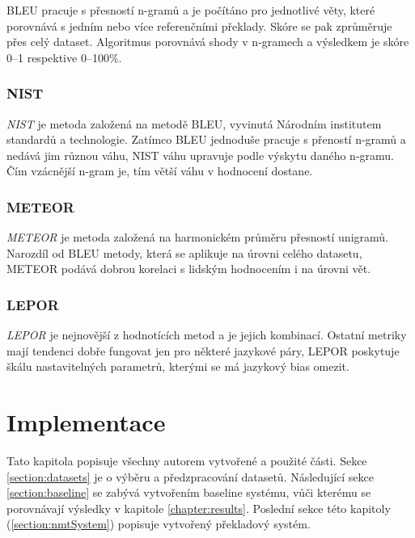 BLEU pracuje s přesností n-gramů a je počítáno pro jednotlivé věty, které porovnává s jedním nebo více referenčními překlady. Skóre se pak zprůměruje přes celý dataset. Algoritmus porovnává shody v n-gramech a výsledkem je skóre 0--1 respektive 0--100\%.

\subsection{NIST}
\emph{NIST} \cite{NIST} je metoda založená na metodě BLEU, vyvinutá Národním institutem standardů a technologie. Zatímco BLEU jednoduše pracuje s přeností n-gramů a nedává jim různou váhu, NIST váhu upravuje podle výskytu daného n-gramu. Čím vzácnější n-gram je, tím větší váhu v hodnocení dostane.


\subsection{METEOR}
\emph{METEOR} \cite{METEOR} je metoda založená na harmonickém průměru přesností unigramů. Narozdíl od BLEU metody, která se aplikuje na úrovni celého datasetu, METEOR podává dobrou korelaci s lidským hodnocením i na úrovni vět. 

\subsection{LEPOR}
\emph{LEPOR} \cite{LEPOR} je nejnovější z hodnotících metod a je jejich kombinací. Ostatní metriky mají tendenci dobře fungovat jen pro některé jazykové páry, LEPOR poskytuje škálu nastavitelných parametrů, kterými se má jazykový bias omezit.


\chapter{Implementace} \label{chapter:implementation}
Tato kapitola popisuje všechny autorem vytvořené a použité části. Sekce \ref{section:datasets} je o výběru a předzpracování datasetů. Následující sekce \ref{section:baseline} se zabývá vytvořením baseline systému, vůči kterému se porovnávají výsledky v kapitole \ref{chapter:results}. Poslední sekce této kapitoly (\ref{section:nmtSystem}) popisuje vytvořený překladový systém.

